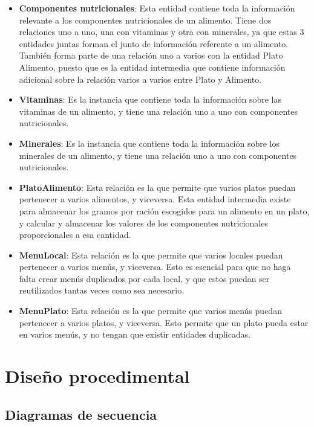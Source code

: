 \begin{itemize}
	\item \textbf{Componentes nutricionales}: Esta entidad contiene toda la información relevante a los componentes nutricionales de un alimento. Tiene dos relaciones uno a uno, una con vitaminas y otra con minerales, ya que estas 3 entidades juntas forman el junto de información referente a un alimento. También forma parte de una relación uno a varios con la entidad Plato \textunderscore Alimento, puesto que es la entidad intermedia que contiene información adicional sobre la relación varios a varios entre Plato y Alimento.
	\item \textbf{Vitaminas}: Es la instancia que contiene toda la información sobre las vitaminas de un alimento, y tiene una relación uno a uno con componentes nutricionales.
	\item \textbf{Minerales}: Es la instancia que contiene toda la información sobre los minerales de un alimento, y tiene una relación uno a uno con componentes nutricionales.
	\item \textbf{Plato\textunderscore Alimento}: Esta relación es la que permite que varios platos puedan pertenecer a varios alimentos, y viceversa. Esta entidad intermedia existe para almacenar los gramos por ración escogidos para un alimento en un plato, y calcular y almacenar los valores de los componentes nutricionales proporcionales a esa cantidad.
	\item \textbf{Menu\textunderscore Local}: Esta relación es la que permite que varios locales puedan pertenecer a varios menús, y viceversa. Esto es esencial para que no haga falta crear menús duplicados por cada local, y que estos puedan ser reutilizados tantas veces como sea necesario.
	\item \textbf{Menu\textunderscore Plato}: Esta relación es la que permite que varios menús puedan pertenecer a varios platos, y viceversa. Esto permite que un plato pueda estar en varios menús, y no tengan que existir entidades duplicadas.
\end{itemize}



\section{Diseño procedimental}

\subsection{Diagramas de secuencia}

